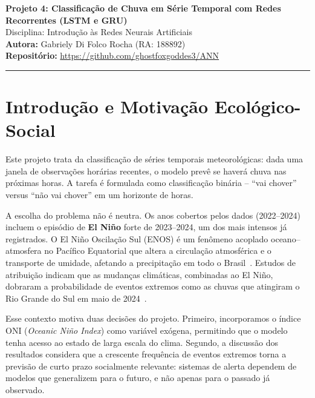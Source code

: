 \documentclass[11pt,a4paper]{article}
\begin{document}
\begin{center}
{\LARGE \textbf{Projeto 4: Classificação de Chuva em Série Temporal com
Redes Recorrentes (LSTM e GRU)}} \\[0.35em]
{\large Disciplina: Introdução às Redes Neurais Artificiais} \\[0.3em]
\textbf{Autora:} Gabriely Di Folco Rocha (RA: 188892) \\[0.2em]
\textbf{Repositório:} \url{https://github.com/ghostfoxgoddes3/ANN}
\end{center}

\vspace{-0.5em}
\hrule
\vspace{0.8em}

\section{Introdução e Motivação Ecológico-Social}

Este projeto trata da classificação de séries temporais meteorológicas: dada
uma janela de observações horárias recentes, o modelo prevê se haverá chuva
nas próximas horas. A tarefa é formulada como classificação binária -- ``vai
chover'' versus ``não vai chover'' em um horizonte de \HORIZON{} horas.

A escolha do problema não é neutra. Os anos cobertos pelos dados
(2022--2024) incluem o episódio de \textbf{El Ni{\~n}o} forte de 2023--2024, um
dos mais intensos já registrados. O El Ni{\~n}o Oscila{\c c}{\~a}o Sul (ENOS)
é um fen{\^o}meno acoplado oceano--atmosfera no Pac{\'i}fico Equatorial que
altera a circula{\c c}{\~a}o atmosf{\'e}rica e o transporte de umidade,
afetando a precipita{\c c}{\~a}o em todo o Brasil~\cite{noaa_oni,
enso_subtropical2026}. Estudos de atribui{\c c}{\~a}o indicam que as mudan{\c
c}as clim{\'a}ticas, combinadas ao El Ni{\~n}o, dobraram a probabilidade de
eventos extremos como as chuvas que atingiram o Rio Grande do Sul em maio de
2024~\cite{rodrigues2024rs}.

Esse contexto motiva duas decis{\~o}es do projeto. Primeiro, incorporamos o
{\'i}ndice ONI (\textit{Oceanic Ni{\~n}o Index}) como vari{\'a}vel ex{\'o}gena,
permitindo que o modelo tenha acesso ao estado de larga escala do clima.
Segundo, a discuss{\~a}o dos resultados considera que a crescente frequ{\^e}ncia
de eventos extremos torna a previs{\~a}o de curto prazo socialmente relevante:
sistemas de alerta dependem de modelos que generalizem para o futuro, e n{\~a}o
apenas para o passado j{\'a} observado.
\end{document}
